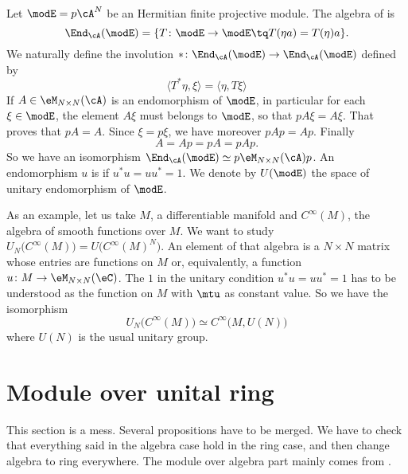 Let $\modE=p\cA^N$ be an Hermitian finite projective module. The algebra of  is
\[ 
  \End_{\cA}(\modE)=\{ T\colon \modE\to \modE\tq T(\eta a)=T(\eta)a \}.
\]
We naturally define the involution $*\colon \End_{\cA}(\modE)\to \End_{\cA}(\modE)$ defined by
\begin{equation}
\langle T^*\eta, \xi\rangle =\langle \eta, T\xi\rangle
\end{equation}
If $A\in\eM_{N\times N}(\cA)$ is an endomorphism of $\modE$, in particular for each $\xi\in\modE$, the element $A\xi$ must belongs to $\modE$, so that $pA\xi=A\xi$. That proves that $pA=A$. Since $\xi=p\xi$, we have moreover $pAp=Ap$. Finally
\[ 
  A=Ap=pA=pAp.
\]
So we have an isomorphism $\End_{\cA}(\modE)\simeq p\eM_{N\times N}(\cA)p$. An endomorphism $u$ is  if $u^*u=uu^*=1$. We denote by $U(\modE)$ the space of unitary endomorphism of $\modE$.

As an example, let us take $M$, a differentiable manifold and $ C^{\infty}(M)$, the algebra of smooth functions over $M$. We want to study $U_N\big(  C^{\infty}(M) \big)=U\big(  C^{\infty}(M)^N \big)$. An element of that algebra is a $N\times N$ matrix whose entries are functions on $M$ or, equivalently, a function $u\colon M\to \eM_{N\times N}(\eC)$. The $1$ in the unitary condition $u^*u=uu^*=1$ has to be understood as the function on $M$ with $\mtu$ as constant value. So we have the isomorphism
\[ 
  U_N\big(  C^{\infty}(M) \big)\simeq C^{\infty}\big( M,U(N) \big)
\]
where $U(N)$ is the usual unitary group.


					\section{Module over unital ring}
\label{SecModUnitalAnneau}

\begin{probleme}
This section is a mess. Several propositions have to be merged. We have to check that everything said in the algebra case hold in the ring case, and then change algebra to ring everywhere. The module over algebra part mainly comes from \cite{Landi}.
\end{probleme}

